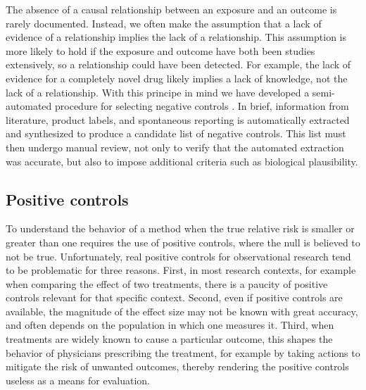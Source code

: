 \documentclass[11pt]{book}
\begin{document}
The absence of a causal relationship between an exposure and an outcome
is rarely documented. Instead, we often make the assumption that a lack
of evidence of a relationship implies the lack of a relationship. This
assumption is more likely to hold if the exposure and outcome have both
been studies extensively, so a relationship could have been detected.
For example, the lack of evidence for a completely novel drug likely
implies a lack of knowledge, not the lack of a relationship. With this
principe in mind we have developed a semi-automated procedure for
selecting negative controls \citep{voss_2016}. In brief, information
from literature, product labels, and spontaneous reporting is
automatically extracted and synthesized to produce a candidate list of
negative controls. This list must then undergo manual review, not only
to verify that the automated extraction was accurate, but also to impose
additional criteria such as biological plausibility.

\subsection{Positive controls}\label{positive-controls}

To understand the behavior of a method when the true relative risk is
smaller or greater than one requires the use of positive controls, where
the null is believed to not be true. Unfortunately, real positive
controls for observational research tend to be problematic for three
reasons. First, in most research contexts, for example when comparing
the effect of two treatments, there is a paucity of positive controls
relevant for that specific context. Second, even if positive controls
are available, the magnitude of the effect size may not be known with
great accuracy, and often depends on the population in which one
measures it. Third, when treatments are widely known to cause a
particular outcome, this shapes the behavior of physicians prescribing
the treatment, for example by taking actions to mitigate the risk of
unwanted outcomes, thereby rendering the positive controls useless as a
means for evaluation. \citep{noren_2014}
\end{document}
